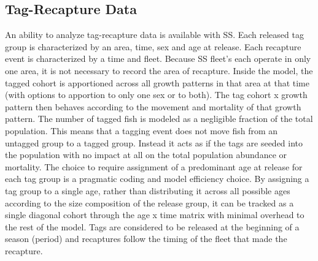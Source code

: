 \subsection{Tag-Recapture Data}
An ability to analyze tag-recapture data is available with SS.  Each released tag group is characterized by an area, time, sex and age at release.  Each recapture event is characterized by a time and fleet.  Because SS fleet’s each operate in only one area, it is not necessary to record the area of recapture.  Inside the model, the tagged cohort is apportioned across all growth patterns in that area at that time (with options to apportion to only one sex or to both).  The tag cohort x growth pattern then behaves according to the movement and mortality of that growth pattern.  The number of tagged fish is modeled as a negligible fraction of the total population.  This means that a tagging event does not move fish from an untagged group to a tagged group.  Instead it acts as if the tags are seeded into the population with no impact at all on the total population abundance or mortality.  The choice to require assignment of a predominant age at release for each tag group is a pragmatic coding and model efficiency choice.  By assigning a tag group to a single age, rather than distributing it across all possible ages according to the size composition of the release group, it can be tracked as a single diagonal cohort through the age x time matrix with minimal overhead to the rest of the model.  Tags are considered to be released at the beginning of a season (period) and recaptures follow the timing of the fleet that made the recapture.

